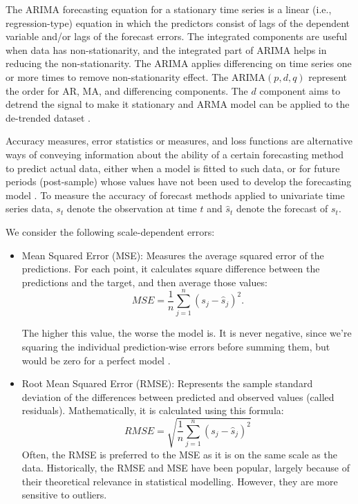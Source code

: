 The ARIMA forecasting equation for a stationary time series is a linear (i.e., regression-type) equation in which the predictors consist of lags of the dependent variable and/or lags of the forecast errors.  The integrated components are useful when data has non-stationarity, and the integrated part of ARIMA helps in reducing the non-stationarity. The ARIMA applies differencing on time series one or more times to remove non-stationarity effect. The ARIMA$(p, d, q)$ represent the order for AR, MA, and differencing components. The $d$ component aims to detrend the signal to make it stationary and ARMA model can be applied to the de-trended dataset . 

Accuracy measures, error statistics or measures, and loss functions are alternative ways of conveying information about the ability of a certain forecasting method to predict actual data, either when a model is fitted to such data, or for future periods (post-sample) whose values have not been used to develop the forecasting model \cite{Makridakis1993}. To measure the accuracy of forecast methods applied to univariate time series data, $s_{t}$ denote the observation at time $t$ and $\hat{s}_t$ denote the forecast of $s_{t}$.

We consider the following scale-dependent errors:
\begin{itemize}
	\item Mean Squared Error (MSE): Measures the average squared error of the predictions. For each point, it calculates square difference between the predictions and the target, and then average those values:
	\begin{equation}
	MSE = \frac{1}{n} \sum_{j=1}^{n} \left(s_j - \hat{s}_j\right)^{2}.
	\end{equation}
	
	The higher this value, the worse the model is. It is never negative, since we're squaring the individual prediction-wise errors before summing them, but would be zero for a perfect model .
	
	\item Root Mean Squared Error (RMSE): Represents the sample standard deviation of the differences between predicted and observed values (called residuals). Mathematically, it is calculated using this formula:
	\begin{equation}
	RMSE = \sqrt{\frac{1}{n} \sum_{j=1}^{n} \left(s_j - \hat{s}_j\right)^2}
	\end{equation}
	Often, the RMSE is preferred to the MSE as it is on the same scale as the data. Historically, the RMSE and MSE have been popular, largely because of their theoretical relevance in statistical modelling. However, they are more sensitive to outliers.
\end{itemize}

